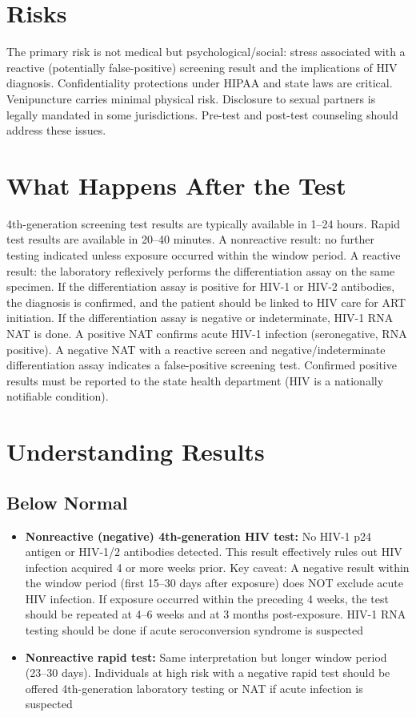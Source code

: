 \section*{Risks}
The primary risk is not medical but psychological/social: stress associated with a reactive (potentially false-positive) screening result and the implications of HIV diagnosis. Confidentiality protections under HIPAA and state laws are critical. Venipuncture carries minimal physical risk. Disclosure to sexual partners is legally mandated in some jurisdictions. Pre-test and post-test counseling should address these issues.

\section*{What Happens After the Test}
4th-generation screening test results are typically available in 1--24 hours. Rapid test results are available in 20--40 minutes. A nonreactive result: no further testing indicated unless exposure occurred within the window period. A reactive result: the laboratory reflexively performs the differentiation assay on the same specimen. If the differentiation assay is positive for HIV-1 or HIV-2 antibodies, the diagnosis is confirmed, and the patient should be linked to HIV care for ART initiation. If the differentiation assay is negative or indeterminate, HIV-1 RNA NAT is done. A positive NAT confirms acute HIV-1 infection (seronegative, RNA positive). A negative NAT with a reactive screen and negative/indeterminate differentiation assay indicates a false-positive screening test. Confirmed positive results must be reported to the state health department (HIV is a nationally notifiable condition).

\section*{Understanding Results}

\subsection*{Below Normal}
\begin{itemize}
  \item \textbf{Nonreactive (negative) 4th-generation HIV test:} No HIV-1 p24 antigen or HIV-1/2 antibodies detected. This result effectively rules out HIV infection acquired 4 or more weeks prior. Key caveat: A negative result within the window period (first 15--30 days after exposure) does NOT exclude acute HIV infection. If exposure occurred within the preceding 4 weeks, the test should be repeated at 4--6 weeks and at 3 months post-exposure. HIV-1 RNA testing should be done if acute seroconversion syndrome is suspected
  \item \textbf{Nonreactive rapid test:} Same interpretation but longer window period (23--30 days). Individuals at high risk with a negative rapid test should be offered 4th-generation laboratory testing or NAT if acute infection is suspected
\end{itemize}

